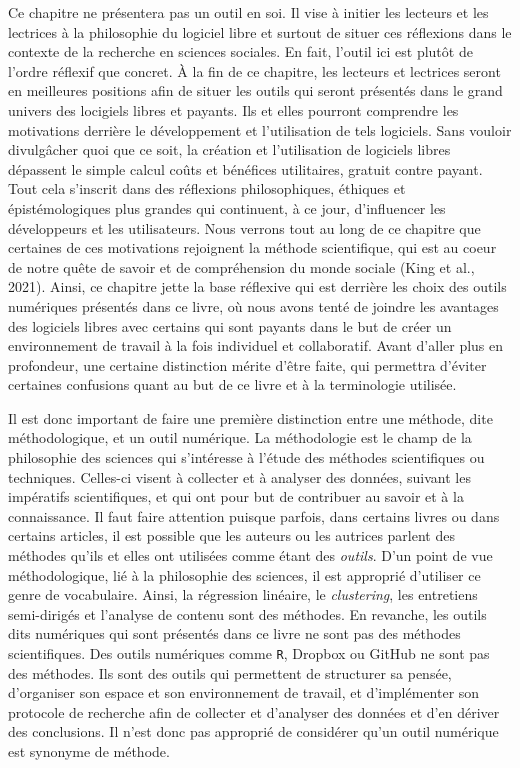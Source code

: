 \documentclass[
  letterpaper,
  DIV=11,
  numbers=noendperiod]{scrreprt}
\begin{document}
Ce chapitre ne présentera pas un outil en soi. Il vise à initier les
lecteurs et les lectrices à la philosophie du logiciel libre et surtout
de situer ces réflexions dans le contexte de la recherche en sciences
sociales. En fait, l'outil ici est plutôt de l'ordre réflexif que
concret. À la fin de ce chapitre, les lecteurs et lectrices seront en
meilleures positions afin de situer les outils qui seront présentés dans
le grand univers des locigiels libres et payants. Ils et elles pourront
comprendre les motivations derrière le développement et l'utilisation de
tels logiciels. Sans vouloir divulgâcher quoi que ce soit, la création
et l'utilisation de logiciels libres dépassent le simple calcul coûts et
bénéfices utilitaires, gratuit contre payant. Tout cela s'inscrit dans
des réflexions philosophiques, éthiques et épistémologiques plus grandes
qui continuent, à ce jour, d'influencer les développeurs et les
utilisateurs. Nous verrons tout au long de ce chapitre que certaines de
ces motivations rejoignent la méthode scientifique, qui est au coeur de
notre quête de savoir et de compréhension du monde sociale (King et al.,
2021). Ainsi, ce chapitre jette la base réflexive qui est derrière les
choix des outils numériques présentés dans ce livre, où nous avons tenté
de joindre les avantages des logiciels libres avec certains qui sont
payants dans le but de créer un environnement de travail à la fois
individuel et collaboratif. Avant d'aller plus en profondeur, une
certaine distinction mérite d'être faite, qui permettra d'éviter
certaines confusions quant au but de ce livre et à la terminologie
utilisée.

Il est donc important de faire une première distinction entre une
méthode, dite méthodologique, et un outil numérique. La méthodologie est
le champ de la philosophie des sciences qui s'intéresse à l'étude des
méthodes scientifiques ou techniques. Celles-ci visent à collecter et à
analyser des données, suivant les impératifs scientifiques, et qui ont
pour but de contribuer au savoir et à la connaissance. Il faut faire
attention puisque parfois, dans certains livres ou dans certains
articles, il est possible que les auteurs ou les autrices parlent des
méthodes qu'ils et elles ont utilisées comme étant des \emph{outils}.
D'un point de vue méthodologique, lié à la philosophie des sciences, il
est approprié d'utiliser ce genre de vocabulaire. Ainsi, la régression
linéaire, le \emph{clustering}, les entretiens semi-dirigés et l'analyse
de contenu sont des méthodes. En revanche, les outils dits numériques
qui sont présentés dans ce livre ne sont pas des méthodes scientifiques.
Des outils numériques comme \texttt{R}, Dropbox ou GitHub ne sont pas
des méthodes. Ils sont des outils qui permettent de structurer sa
pensée, d'organiser son espace et son environnement de travail, et
d'implémenter son protocole de recherche afin de collecter et d'analyser
des données et d'en dériver des conclusions. Il n'est donc pas approprié
de considérer qu'un outil numérique est synonyme de méthode.
\end{document}
